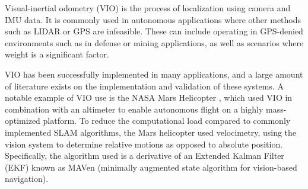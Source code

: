 \documentclass[bare_jrnl_transmag]{subfiles}
\begin{document}
Visual-inertial odometry (VIO) is the process of localization using camera and IMU data. It is commonly used in autonomous applications where other methods such as LIDAR or GPS are infeasible. These can include operating in GPS-denied environments such as in defense or mining applications, as well as scenarios where weight is a significant factor. 

VIO has been successfully implemented in many applications, and a large amount of literature exists on the implementation and validation of these systems. A notable example of VIO use is the NASA Mars Helicopter \cite{mars_paper}, which used VIO in combination with an altimeter to enable autonomous flight on a highly mass-optimized platform. To reduce the computational load compared to commonly implemented SLAM algorithms, the Mars helicopter used velocimetry, using the vision system to determine relative motions as opposed to absolute position. Specifically, the algorithm used is a derivative of an Extended Kalman Filter (EKF) known as MAVen (minimally augmented state algorithm for vision-based navigation). 
\end{document}
